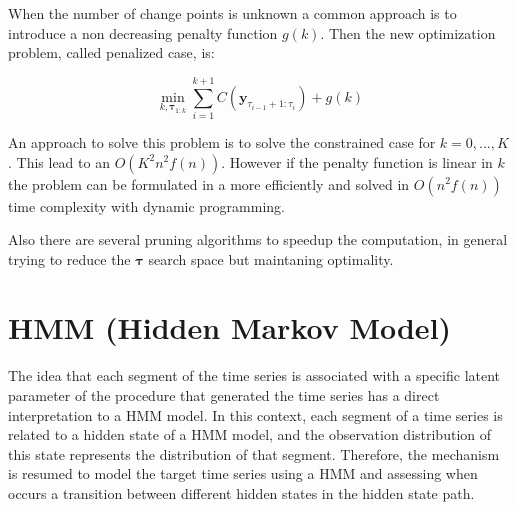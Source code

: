 

When the number of change points is unknown a common approach is to introduce a non decreasing penalty function $g(k)$. Then the new optimization problem, called penalized case, is:

\begin{equation}
    \min_{k, \boldsymbol \tau_{1 : k}} \sum \limits_{i = 1}^{k + 1} C(\mathbf{y}_{\tau_{i - 1} + 1 : \tau_{i}}) + g(k)
\end{equation}

An approach to solve this problem is to solve the constrained case for $k = 0, ..., K$. This lead to an $O(K^{2} n^{2} f(n))$. However if the penalty function is linear in $k$ the problem can be formulated in a more efficiently and solved in $O(n^{2} f(n))$ time complexity with dynamic programming.

Also there are several pruning algorithms to speedup the computation, in general trying to reduce the $\boldsymbol \tau$ search space but maintaning optimality.

\section{HMM (Hidden Markov Model)}

The idea that each segment of the time series is associated with a specific latent parameter of the procedure that generated the time series has a direct interpretation to a HMM model. In this context, each segment of a time series is related to a hidden state of a HMM model, and the observation distribution of this state represents the distribution of that segment. Therefore, the mechanism is resumed to model the target time series using a HMM and assessing when occurs a transition between different hidden states in the hidden state path.

